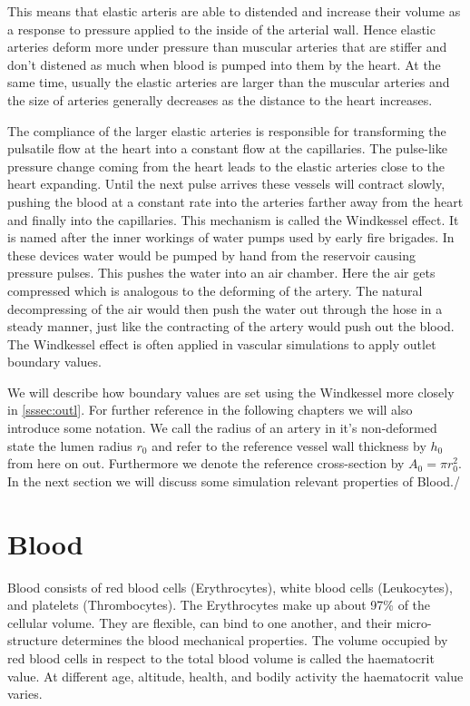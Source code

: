 \documentclass[a4paper, oneside]{discothesis}
\begin{document}
This means that elastic arteris are able to distended and increase their volume as a response to pressure applied to the inside of the arterial wall.
Hence elastic arteries deform more under pressure than muscular arteries that are stiffer and don't distened as much when blood is pumped into them by the heart.
At the same time, usually the elastic arteries are larger than the muscular arteries and the size of arteries generally decreases as the distance to the heart increases.

The compliance of the larger elastic arteries is responsible for transforming the pulsatile flow at the heart into a constant flow at the capillaries.
The pulse-like pressure change coming from the heart leads to the elastic arteries close to the heart expanding.
Until the next pulse arrives these vessels will contract slowly, pushing the blood at a constant rate into the arteries farther away from the heart and finally into the capillaries.
This mechanism is called the Windkessel effect.
It is named after the inner workings of water pumps used by early fire brigades.
In these devices water would be pumped by hand from the reservoir causing pressure pulses.
This pushes the water into an air chamber.
Here the air gets compressed which is analogous to the deforming of the artery.
The natural decompressing of the air would then push the water out through the hose in a steady manner, just like the contracting of the artery would push out the blood.
The Windkessel effect is often applied in vascular simulations to apply outlet boundary values. \cite{köppl2023dimension}

We will describe how boundary values are set using the Windkessel more closely in \autoref{sssec:outl}.
For further reference in the following chapters we will also introduce some notation.
We call the radius of an artery in it's non-deformed state the lumen radius $r_0$ and refer to the reference vessel wall thickness by $h_0$ from here on out.
Furthermore we denote the reference cross-section by $A_0 = \pi r_0^2$.
In the next section we will discuss some simulation relevant properties of Blood./

\section{Blood} \label{b}
Blood consists of red blood cells (Erythrocytes), white blood cells (Leukocytes), and platelets (Thrombocytes).
The Erythrocytes make up about 97\% of the cellular volume.
They are flexible, can bind to one another, and their micro-structure determines the blood mechanical properties.
The volume occupied by red blood cells in respect to the total blood volume is called the haematocrit value.
At different age, altitude, health, and bodily activity the haematocrit value varies.
\end{document}
